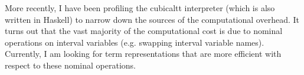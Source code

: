 \documentclass[12pt]{article}
\theoremstyle{definition}
\begin{document}
More recently, I have been profiling the cubicaltt interpreter (which is also written in Haskell) to narrow down the sources of the computational overhead. It turns out that the vast majority of the computational cost is due to nominal operations on interval variables (e.g. swapping interval variable names). Currently, I am looking for term representations that are more efficient with respect to these nominal operations.




\end{document}
